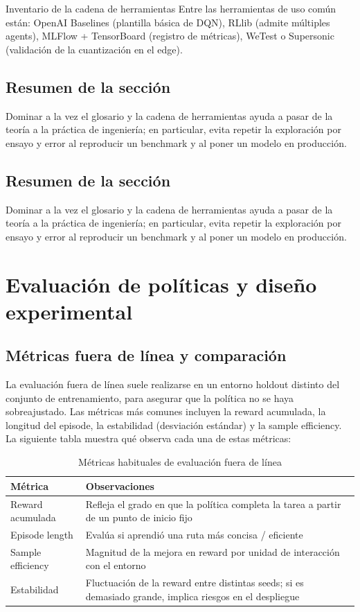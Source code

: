 \documentclass[a4paper]{article}
\begin{document}
\begin{knowledgebox}{Inventario de la cadena de herramientas}
Entre las herramientas de uso común están: OpenAI Baselines (plantilla básica de DQN), RLlib (admite múltiples agents), MLFlow + TensorBoard (registro de métricas), WeTest o Supersonic (validación de la cuantización en el edge).
\end{knowledgebox}

\subsection{Resumen de la sección}

Dominar a la vez el glosario y la cadena de herramientas ayuda a pasar de la teoría a la práctica de ingeniería; en particular, evita repetir la exploración por ensayo y error al reproducir un benchmark y al poner un modelo en producción.

 \subsection{Resumen de la sección}

Dominar a la vez el glosario y la cadena de herramientas ayuda a pasar de la teoría a la práctica de ingeniería; en particular, evita repetir la exploración por ensayo y error al reproducir un benchmark y al poner un modelo en producción.

\section{Evaluación de políticas y diseño experimental}

\subsection{Métricas fuera de línea y comparación}

La evaluación fuera de línea suele realizarse en un entorno holdout distinto del conjunto de entrenamiento, para asegurar que la política no se haya sobreajustado. Las métricas más comunes incluyen la reward acumulada, la longitud del episode, la estabilidad (desviación estándar) y la sample efficiency. La siguiente tabla muestra qué observa cada una de estas métricas:

\begin{table}[H]
\centering
\begin{tabular}{lp{8cm}}
\toprule
Métrica & Observaciones \\
\midrule
Reward acumulada & Refleja el grado en que la política completa la tarea a partir de un punto de inicio fijo \\
Episode length & Evalúa si aprendió una ruta más concisa / eficiente \\
Sample efficiency & Magnitud de la mejora en reward por unidad de interacción con el entorno \\
Estabilidad & Fluctuación de la reward entre distintas seeds; si es demasiado grande, implica riesgos en el despliegue \\
\bottomrule
\end{tabular}
\caption{Métricas habituales de evaluación fuera de línea}
\end{table}
\end{document}
